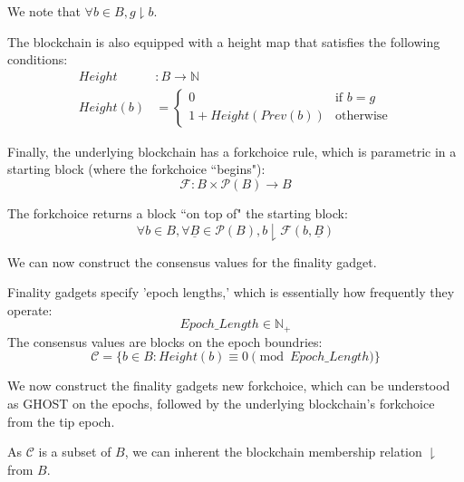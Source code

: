 \begin{defn}
We note that $\forall b \in B, g \downharpoonright b$.

The blockchain is also equipped with a height map that satisfies the following conditions:
\begin{align*}
  Height&: B \to \mathbb{N} \\
  Height(b) &= \begin{cases}
    \text{$0$} &\text{if $b = g$} \\
    \text{$1 + Height(Prev(b))$} &\text{otherwise}
  \end{cases}
\end{align*}

Finally, the underlying blockchain has a forkchoice rule, which is parametric in a starting block (where the forkchoice ``begins"):
$$
\mathcal{F}: B \times \mathcal{P}(B) \to B
$$

The forkchoice returns a block ``on top of" the starting block:
$$
\forall b \in B, \forall \underline{B} \in \mathcal{P}(B), b \downharpoonright \mathcal{F}(b, \underline{B})
$$
\end{defn}

We can now construct the consensus values for the finality gadget.
\begin{defn}
Finality gadgets specify 'epoch lengths,' which is essentially how frequently they operate:
$$
Epoch\_Length \in \mathbb{N}_+
$$
The consensus values are blocks on the epoch boundries:
$$
\mathcal{C} = \{b \in B : Height(b) \equiv 0 \pmod{Epoch\_Length}\}
$$
\end{defn}

We now construct the finality gadgets new forkchoice, which can be understood as GHOST on the epochs, followed by the underlying blockchain's forkchoice from the tip epoch.

As $\mathcal{C}$ is a subset of $B$, we can inherent the blockchain membership relation $\downharpoonright$ from $B$.

